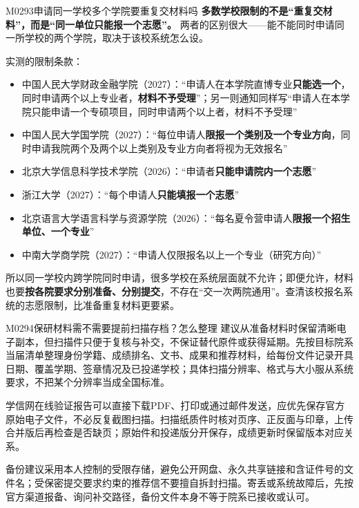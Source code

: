 \begin{qa}{M0293}{申请同一学校多个学院要重复交材料吗}
\textbf{多数学校限制的不是“重复交材料”，而是“同一单位只能报一个志愿”。} 两者的区别很大——能不能同时申请同一所学校的两个学院，取决于该校系统怎么设。

实测的限制条款：

\begin{itemize}
  \item 中国人民大学财政金融学院（2027）：“申请人在本学院直博专业\textbf{只能选一个}，同时申请两个以上专业者，\textbf{材料不予受理}”；另一则通知同样写“申请人在本学院只能申请一个专硕项目，同时申请两个以上者，材料不予受理”
  \item 中国人民大学国学院（2027）：“每位申请人\textbf{限报一个类别及一个专业方向}，同时申请我院两个及两个以上类别及专业方向者将视为无效报名”
  \item 北京大学信息科学技术学院（2026）：“申请者\textbf{只能申请院内一个志愿}”
  \item 浙江大学（2027）：“每个申请人\textbf{只能填报一个志愿}”
  \item 北京语言大学语言科学与资源学院（2026）：“每名夏令营申请人\textbf{限报一个招生单位、一个专业}”
  \item 中南大学商学院（2027）：“申请人仅限报名以上一个专业（研究方向）”
\end{itemize}

所以同一学校内跨学院同时申请，很多学校在系统层面就不允许；即便允许，材料也要\textbf{按各院要求分别准备、分别提交}，不存在“交一次两院通用”。查清该校报名系统的志愿限制，比准备重复材料更要紧。
\end{qa}

\begin{qa}{M0294}{保研材料需不需要提前扫描存档？怎么整理}
建议从准备材料时保留清晰电子副本，但扫描件只便于复核与补交，不保证替代原件或获得延期。先按目标院系当届清单整理身份学籍、成绩排名、文书、成果和推荐材料，给每份文件记录开具日期、覆盖学期、签章情况及已投递学校；具体扫描分辨率、格式与大小服从系统要求，不把某个分辨率当成全国标准。

学信网在线验证报告可以直接下载PDF、打印或通过邮件发送，应优先保存官方原始电子文件，不必反复截图扫描。扫描纸质件时核对页序、正反面与印章，上传合并版后再检查是否缺页；原始件和投递版分开保存，成绩更新时保留版本对应关系。

备份建议采用本人控制的受限存储，避免公开网盘、永久共享链接和含证件号的文件名；受保密提交要求约束的推荐信不要擅自拆封扫描。寄丢或系统故障后，先按官方渠道报备、询问补交路径，备份文件本身不等于院系已接收或认可。
\end{qa}

